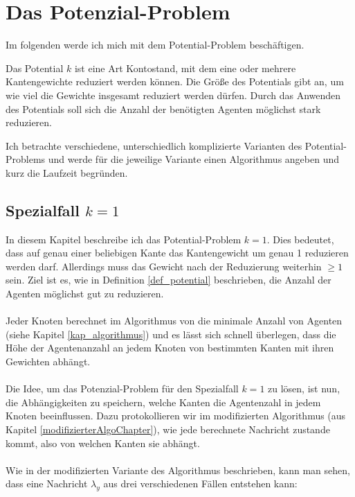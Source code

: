 \section{Das Potenzial-Problem}

Im folgenden werde ich mich mit dem Potential-Problem beschäftigen.

\begin{mydef}\label{def_potential}
	Das Potential $k$ ist eine Art Kontostand, mit dem eine oder mehrere Kantengewichte reduziert werden können. Die Größe des Potentials gibt an, um wie viel die Gewichte insgesamt reduziert werden dürfen. Durch das Anwenden des Potentials soll sich die Anzahl der benötigten Agenten möglichst stark reduzieren.
\end{mydef}

Ich betrachte verschiedene, unterschiedlich komplizierte Varianten des Potential-Problems und werde für die jeweilige Variante einen Algorithmus angeben und kurz die Laufzeit begründen.

\subsection{Spezialfall $k = 1$}

In diesem Kapitel beschreibe ich das Potential-Problem $k = 1$. Dies bedeutet, dass auf genau einer beliebigen Kante das Kantengewicht um genau 1 reduzieren werden darf. Allerdings muss das Gewicht nach der Reduzierung  weiterhin $\geq 1$ sein. Ziel ist es, wie in Definition \ref{def_potential} beschrieben, die Anzahl der Agenten möglichst gut zu reduzieren.
\\
\\
Jeder Knoten berechnet im Algorithmus von \cite{cima_paper} die minimale Anzahl von Agenten (siehe Kapitel \ref{kap_algorithmus}) und es lässt sich schnell überlegen, dass die Höhe der Agentenanzahl an jedem Knoten von bestimmten Kanten mit ihren Gewichten abhängt.
\\
\\
Die Idee, um das Potenzial-Problem für den Spezialfall $k = 1$ zu lösen, ist nun, die Abhängigkeiten zu speichern, welche Kanten die Agentenzahl in jedem Knoten beeinflussen. Dazu protokollieren wir im modifizierten Algorithmus (aus Kapitel \ref{modifizierterAlgoChapter}), wie jede berechnete Nachricht zustande kommt, also von welchen Kanten sie abhängt.
\\
\\ 
Wie in der modifizierten Variante des Algorithmus beschrieben, kann man sehen, dass eine Nachricht $\lambda_{y}$ aus drei verschiedenen Fällen entstehen kann:

